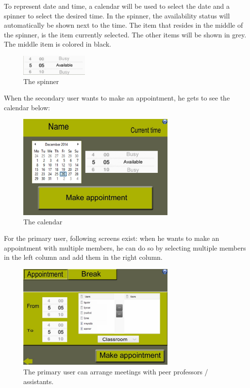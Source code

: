 \documentclass[11pt, a4paper,svglistings]{report}
\begin{document}
To represent date and time, a calendar will be used to select the date and a spinner to select the desired time. In the spinner, the availability status will automatically be shown next to the time. The item that resides in the middle of the spinner, is the item currently selected. The other items will be shown in grey. The middle item is colored in black. 

\begin{figure}[H]
\centering
    \includegraphics[width=0.3\textwidth]{Spinner.png}
  \caption[The spinner]{The spinner}
\end{figure}

When the secondary user wants to make an appointment, he gets to see the calendar below:

\begin{figure}[H]
\centering
    \includegraphics[width=0.7\textwidth]{Calendar.jpg}
  \caption[The calendar]{The calendar}
\end{figure}

For the primary user, following screens exist: when he wants to make an appointment with multiple members, he can do so by selecting multiple members in the left column and add them in the right column.

\begin{figure}[H]
\centering
    \includegraphics[width=0.7\textwidth]{Appointment.jpg}
  \caption[Appointment primary user]{The primary user can arrange meetings with peer professors / assistants.}
\end{figure}
\end{document}
